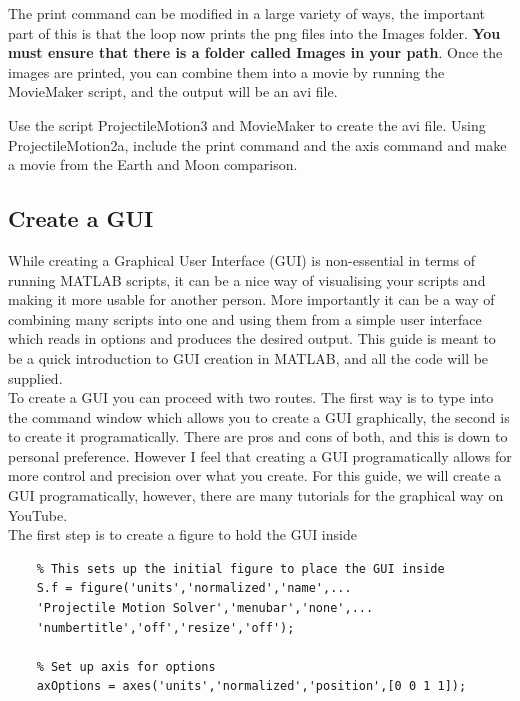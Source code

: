 \documentclass[12pt]{report}
\begin{document}
\noindent The print command can be modified in a large variety of ways, the important part of this is that the loop now prints the png files into the Images folder. \textbf{You must ensure that there is a folder called Images in your path}. Once the images are printed, you can combine them into a movie by running the MovieMaker script, and the output will be an avi file.

\begin{tcolorbox}[title=Task (Optional)]
Use the script ProjectileMotion3 and MovieMaker to create the avi file. Using ProjectileMotion2a, include the print command and the axis command and make a movie from the Earth and Moon comparison.
\end{tcolorbox}

\subsection*{Create a GUI}
While creating a Graphical User Interface (GUI) is non-essential in terms of running MATLAB scripts, it can be a nice way of visualising your scripts and making it more usable for another person. More importantly it can be a way of combining many scripts into one and using them from a simple user interface which reads in options and produces the desired output. This guide is meant to be a quick introduction to GUI creation in MATLAB, and all the code will be supplied.\\

\noindent To create a GUI you can proceed with two routes. The first way is to type  into the command window which allows you to create a GUI graphically, the second is to create it programatically. There are pros and cons of both, and this is down to personal preference. However I feel that creating a GUI programatically allows for more control and precision over what you create. For this guide, we will create a GUI programatically, however, there are many tutorials for the graphical way on YouTube.\\

\noindent The first step is to create a figure to hold the GUI inside
\begin{lstlisting}
    % This sets up the initial figure to place the GUI inside
    S.f = figure('units','normalized','name',...
    'Projectile Motion Solver','menubar','none',...
    'numbertitle','off','resize','off');
    
    % Set up axis for options
    axOptions = axes('units','normalized','position',[0 0 1 1]);
\end{lstlisting}
\end{document}
